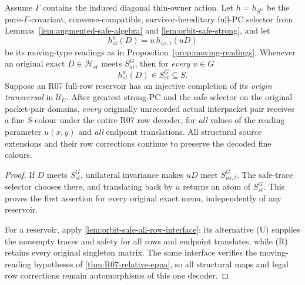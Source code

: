 \begin{lemma}
\label{lem:orbit-safe-readings}
Assume $\Gamma$ contains the induced diagonal thin-owner action.
Let $h=h_{S^G}$ be the pure-$\Gamma$-covariant,
converse-compatible, survivor-hereditary full-PC selector
from Lemmas~\ref{lem:augmented-safe-algebra} and
\ref{lem:orbit-safe-strong}, and let
\[
      h^u_{st}(D)=u\,h_{us,t}(uD)
\]
be its moving-type readings as in
Proposition~\ref{prop:moving-readings}.
Whenever an original exact $D\in\mathcal H_{st}$ meets
$S^G_{st}$, then for \emph{every} $u\in G$
\[
                 h^u_{st}(D)\in S^G_{st}\subseteq S.
\]
Suppose an R07 full-row reservoir has an injective
completion of its \emph{origin transversal} in
$\mathcal U_U$.  After greatest strong-PC and the safe
selector on the original packet-pair domains,
\emph{every} originally unrecorded actual interpacket
pair receives a fine $S$-colour under the entire R07
row decoder, for \emph{all} values of the reading
parameter $u(x,y)$ and \emph{all} endpoint translations.
All structural source extensions and their row corrections
continue to preserve the decoded fine colours.
\end{lemma}
\begin{proof}
If $D$ meets $S^G_{st}$, unilateral invariance makes $uD$ meet
$S^G_{us,t}$. The safe-trace selector chooses there, and translating
back by $u$ returns an atom of $S^G_{st}$. This proves the first
assertion for every original exact menu, independently of any
reservoir.

For a reservoir, apply \cref{lem:orbit-safe-all-row-interface}:
its alternative (U) supplies the nonempty traces and safety for all
rows and endpoint translates, while (R) retains every original
singleton matrix. The same interface verifies the moving-reading
hypotheses of \cref{thm:R07-relative-eppa}, so all structural maps
and legal row corrections remain automorphisms of this one decoder.
\end{proof}
